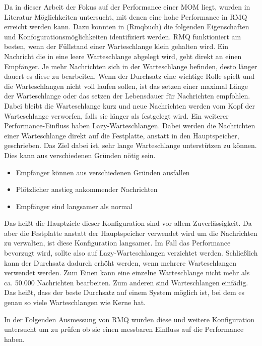 Da in dieser Arbeit der Fokus auf der Performance einer MOM liegt, wurden in Literatur Möglichkeiten untersucht, mit denen eine hohe Performance in RMQ erreicht werden kann. Dazu konnten in (Rmqbuch) die folgenden Eigenschaften und Konfogurationsmöglichkeiten identifiziert werden. RMQ funktioniert am besten, wenn der Füllstand einer Warteschlange klein gehalten wird. Ein Nachricht die in eine leere Warteschlange abgelegt wird, geht direkt an einen Empfänger. Je mehr Nachrichten sich in der Warteschlange befinden, desto länger dauert es diese zu bearbeiten. Wenn der Durchsatz eine wichtige Rolle spielt und die Warteschlangen nicht voll laufen sollen, ist das setzen einer maximal Länge der Warteschlange oder das setzen der Lebensdauer für Nachrichten empfohlen. Dabei bleibt die Warteschlange kurz und neue Nachrichten werden vom Kopf der Warteschlange verworfen, falls sie länger als festgelegt wird. Ein weiterer Performance-Einfluss haben Lazy-Warteschlangen. Dabei werden die Nachrichten einer Warteschlange direkt auf die Festplatte, anstatt in den Hauptspeicher, geschrieben. Das Ziel dabei ist, sehr lange Warteschlange unterstützen zu können. Dies kann aus verschiedenen Gründen nötig sein. 
\begin{itemize}
    \item Empfänger können aus verschiedenen Gründen ausfallen
    \item Plötzlicher anstieg ankommender Nachrichten
    \item Empfänger sind langsamer als normal
\end{itemize}
Das heißt die Hauptziele dieser Konfiguration sind vor allem Zuverlässigkeit. Da aber die Festplatte anstatt der Hauptspeicher verwendet wird um die Nachrichten zu verwalten, ist diese Konfiguration langsamer. Im Fall das Performance bevorzugt wird, sollte also auf Lazy-Warteschlangen verzichtet werden. Schließlich kann der Durchsatz dadurch erhöht werden, wenn mehrere Warteschlangen verwendet werden. Zum Einen kann eine einzelne Warteschlange nicht mehr als ca. 50.000 Nachrichten bearbeiten. Zum anderen sind Warteschlangen einfädig. Das heißt, dass der beste Durchsatz auf einem System möglich ist, bei dem es genau so viele Warteschlangen wie Kerne hat. 

In der Folgenden Ausmessung von RMQ wurden diese und weitere Konfiguration untersucht um zu prüfen ob sie einen messbaren Einfluss auf die Performance haben.


